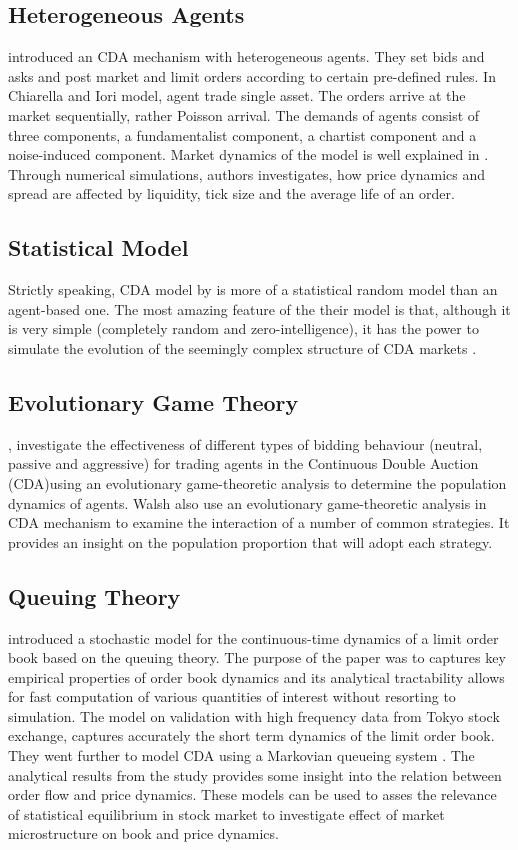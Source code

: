 \documentclass[12pt,a4paper]{article}
\numberwithin{equation}{section}
\numberwithin{figure}{section}
\numberwithin{table}{section}
\begin{document}
\subsection{Heterogeneous Agents}
\citet{chiarella2002} introduced an CDA mechanism with heterogeneous agents. They set bids and asks and post market and limit orders according to certain pre-defined rules. In Chiarella and Iori model, agent trade single asset. The orders arrive at the market sequentially, rather Poisson arrival. The demands of agents consist of three components, a fundamentalist component, a chartist component and a noise-induced component. Market dynamics of the model is well explained in \citet{chiarella2002}. Through numerical simulations, authors investigates, how price dynamics and spread are affected by liquidity, tick size and the average life of an order.

\subsection{Statistical Model}
Strictly speaking,  CDA model by \citet{SmithFarmerGillemotKrishnamurty2003} is more of a statistical random model than an agent-based one. The most amazing feature of the their model is that, although it is very simple (completely random and zero-intelligence), it has the power to simulate the evolution of the seemingly complex structure of CDA markets \citep{guo2005}.

\subsection{Evolutionary Game Theory}
\citet{Vytelingum2006}, investigate the eﬀectiveness of diﬀerent types of bidding behaviour (neutral, passive and aggressive) for trading agents in the Continuous Double Auction (CDA)using an evolutionary game-theoretic
analysis to determine the population dynamics of agents. Walsh \citep{Vytelingum2006} also use an evolutionary game-theoretic analysis in CDA mechanism to examine the interaction of a number of common strategies. It provides 
an insight on the population proportion that will adopt each strategy.
\subsection{Queuing Theory}
\citet{cont2010} introduced a stochastic model for the continuous-time dynamics of a limit order book based on the queuing theory. The purpose of the paper was to captures key empirical properties of order book dynamics and
its analytical tractability allows for fast computation of various quantities of interest without resorting to
simulation. The model on validation with high frequency data from Tokyo stock exchange, captures accurately the short term dynamics of the limit order book. They went further to model CDA using a Markovian queueing system \citep{cont2011}. The analytical results from the study provides some insight into the relation between order 
flow and price dynamics. These models can be used to asses the relevance of statistical equilibrium in stock market to investigate effect of market microstructure on book and price dynamics. 
\end{document}
